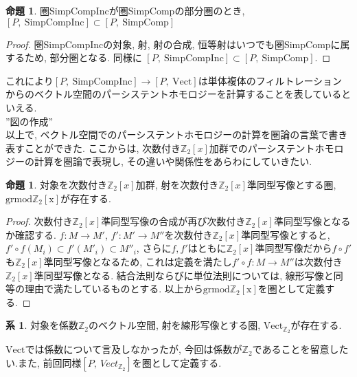 \documentclass[a4paper]{jsarticle}
\theoremstyle{definition}
\newtheorem{prop}[dfn]{命題}
\newtheorem{cor}[dfn]{系}
\newcommand{\SimpComp}{{\mathrm{SimpComp}}}
\newcommand{\Fun}[2]{[#1,~#2]}
\newcommand{\Vect}{{\mathrm{Vect}}}
\newcommand{\SimpCompInc}{{\mathrm{SimpCompInc}}}
\newcommand{\grmodZ}{{\mathrm{grmod \mathbb{Z}_2[x]}}}
\begin{document}
\begin{prop}
    圏SimpCompIncが圏SimpCompの部分圏のとき, $\Fun{P}{\SimpCompInc}\subset \Fun{P}{\SimpComp}$
\end{prop}
\begin{proof}
     圏SimpCompIncの対象, 射, 射の合成, 恒等射はいつでも圏SimpCompに属するため, 部分圏となる. 同様に $\Fun{P}{\SimpCompInc}\subset \Fun{P}{\SimpComp}$.
\end{proof}
 これにより$\Fun{P}{\SimpCompInc} \rightarrow \Fun{P}{\Vect}$は単体複体のフィルトレーションからのベクトル空間のパーシステントホモロジーを計算することを表しているといえる. \\
 ”図の作成”\\
以上で, ベクトル空間でのパーシステントホモロジーの計算を圏論の言葉で書き表すことができた. ここからは, 次数付き$\mathbb{Z}_2[x]$加群でのパーシステントホモロジーの計算を圏論で表現し, その違いや関係性をあらわにしていきたい.
\begin{prop}
    対象を次数付き$\mathbb{Z}_2[x]$加群, 射を次数付き$\mathbb{Z}_2[x]$準同型写像とする圏, $\grmodZ$が存在する.
\end{prop}
\begin{proof}
    次数付き$\mathbb{Z}_2[x]$準同型写像の合成が再び次数付き$\mathbb{Z}_2[x]$準同型写像となるか確認する. $f:M\rightarrow M'$, $f':M'\rightarrow M''$を次数付き$\mathbb{Z}_2[x]$準同型写像とすると, $ f'\circ f(M_i)\subset f'(M'_i) \subset M''_i$, さらに$f, f'$はともに$\mathbb{Z}_2[x]$準同型写像だから$f\circ f'$も$\mathbb{Z}_2[x]$準同型写像となるため, これは定義を満たし$f'\circ f:M\rightarrow M''$は次数付き$\mathbb{Z}_2[x]$準同型写像となる. 結合法則ならびに単位法則については, 線形写像と同等の理由で満たしているものとする. 以上から$\grmodZ$を圏として定義する.
\end{proof}
\begin{cor}
    対象を係数$\mathbb{Z}_2$のベクトル空間, 射を線形写像とする圏, $\Vect_{\mathbb{Z}_2}$が存在する.
\end{cor}
$\Vect$では係数について言及しなかったが, 今回は係数が$\mathbb{Z}_2$であることを留意したい.また, 前回同様$\Fun{P}{Vect_{\mathbb{Z}_2}}$を圏として定義する.
\end{document}
